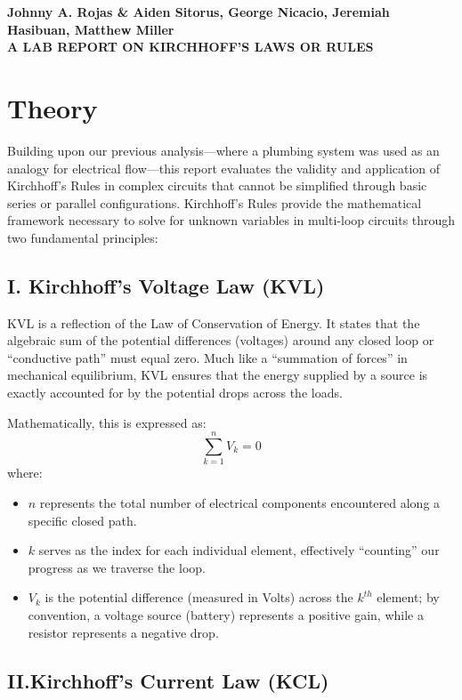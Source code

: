 \documentclass[12pt]{article}
\begin{document}
\begin{center}
    {\textbf{Johnny A. Rojas \& Aiden Sitorus, George Nicacio, Jeremiah
        Hasibuan, Matthew Miller}}\\
    {\Large \textbf{A LAB REPORT ON KIRCHHOFF'S LAWS OR RULES}}
\end{center}

\section{Theory}
Building upon our previous analysis—where a plumbing system was used as an
analogy for electrical flow—this report evaluates the validity and application
of Kirchhoff’s Rules in complex circuits that cannot be simplified through basic
series or parallel configurations. Kirchhoff’s Rules provide the mathematical
framework necessary to solve for unknown variables in multi-loop circuits
through two fundamental principles:

\subsection*{I. Kirchhoff’s Voltage Law (KVL)}

KVL is a reflection of the Law of Conservation of Energy. It states that the
algebraic sum of the potential differences (voltages) around any closed loop or
``conductive path'' must equal zero. Much like a ``summation of forces'' in
mechanical equilibrium, KVL ensures that the energy supplied by a source is
exactly accounted for by the potential drops across the loads.

Mathematically, this is expressed as:
\begin{equation*}
  \sum_{k=1}^{n} V_k = 0
\end{equation*}
where:
\begin{itemize}
  \item $n$ represents the total number of electrical components encountered
        along a specific closed path.
  \item $k$ serves as the index for each individual element, effectively
        ``counting'' our progress as we traverse the loop.
  \item $V_k$ is the potential difference (measured in Volts) across the $k^{th}$
        element; by convention, a voltage source (battery) represents a positive
        gain, while a resistor represents a negative drop.
\end{itemize}

\subsection*{II.\@ Kirchhoff’s Current Law (KCL)}
\end{document}
